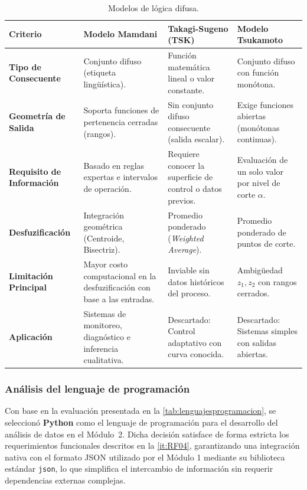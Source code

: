 \begin{table}[htbp]
    \centering
    \small
    \caption{Modelos de lógica difusa.}
    \label{tab:modelos_logica_difusa}
    \begin{tabular}{|>{\raggedright\arraybackslash}p{2.6cm}|>{\raggedright\arraybackslash}p{3.8cm}|>{\raggedright\arraybackslash}p{4.2cm}|>{\raggedright\arraybackslash}p{3.8cm}|}
        \hline
        \textbf{Criterio} & \textbf{Modelo Mamdani}\cite{Morcillo} & \textbf{Takagi-Sugeno (TSK)} & \textbf{Modelo Tsukamoto} \\ \hline
        \textbf{Tipo de Consecuente} & Conjunto difuso (etiqueta lingüística). & Función matemática lineal o valor constante. & Conjunto difuso con función monótona. \\ \hline
        \textbf{Geometría de Salida} & Soporta funciones de pertenencia cerradas (rangos). & Sin conjunto difuso consecuente (salida escalar). & Exige funciones abiertas (monótonas continuas). \\ \hline
        \textbf{Requisito de Información} & Basado en reglas expertas e intervalos de operación. & Requiere conocer la superficie de control o datos previos. & Evaluación de un solo valor por nivel de corte $\alpha$. \\ \hline
        \textbf{Desfuzificación} & Integración geométrica (Centroide, Bisectriz). & Promedio ponderado (\textit{Weighted Average}). & Promedio ponderado de puntos de corte. \\ \hline
        \textbf{Limitación Principal} & Mayor costo computacional en la desfuzificación con base a las entradas. & Inviable sin datos históricos del proceso. & Ambigüedad $z_1, z_2$ con rangos cerrados. \\ \hline
        \textbf{Aplicación} & Sistemas de monitoreo, diagnóstico e inferencia cualitativa. & Descartado: Control adaptativo con curva conocida. & Descartado: Sistemas simples con salidas abiertas. \\ \hline
    \end{tabular}
\end{table}


\subsubsection{Análisis del lenguaje de programación}




Con base en la evaluación presentada en la \cref{tab:lenguajesprogramacion}, 
se seleccionó \textbf{Python} como el lenguaje de programación para el
desarrollo del análisis de datos en el Módulo~2. Dicha decisión 
satisface de forma estricta los requerimientos funcionales descritos 
en la \cref{it:RF04}, garantizando una integración nativa con el formato 
JSON utilizado por el Módulo 1 mediante su biblioteca estándar \texttt{json}, 
lo que simplifica el intercambio de información sin requerir dependencias 
externas complejas.

